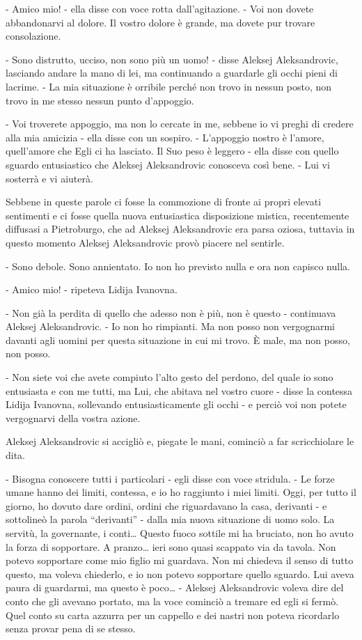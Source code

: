 - Amico mio! - ella disse con voce rotta dall'agitazione. - Voi non dovete abbandonarvi al dolore. Il vostro dolore è grande, ma dovete pur trovare consolazione. 

- Sono distrutto, ucciso, non sono più un uomo! - disse Aleksej Aleksandrovic, lasciando andare la mano di lei, ma continuando a guardarle gli occhi pieni di lacrime. - La mia situazione è orribile perché non trovo in nessun posto, non trovo in me stesso nessun punto d'appoggio. 

- Voi troverete appoggio, ma non lo cercate in me, sebbene io vi preghi di credere alla mia amicizia - ella disse con un sospiro. - L'appoggio nostro è l'amore, quell'amore che Egli ci ha lasciato. Il Suo peso è leggero - ella disse con quello sguardo entusiastico che Aleksej Aleksandrovic conosceva così bene. - Lui vi sosterrà e vi aiuterà. 

Sebbene in queste parole ci fosse la commozione di fronte ai propri elevati sentimenti e ci fosse quella nuova entusiastica disposizione mistica, recentemente diffusasi a Pietroburgo, che ad Aleksej Aleksandrovic era parsa oziosa, tuttavia in questo momento Aleksej Aleksandrovic provò piacere nel sentirle. 

- Sono debole. Sono annientato. Io non ho previsto nulla e ora non capisco nulla. 

- Amico mio! - ripeteva Lidija Ivanovna. 

- Non già la perdita di quello che adesso non è più, non è questo - continuava Aleksej Aleksandrovic. - Io non ho rimpianti. Ma non posso non vergognarmi davanti agli uomini per questa situazione in cui mi trovo. È male, ma non posso, non posso. 

- Non siete voi che avete compiuto l'alto gesto del perdono, del quale io sono entusiasta e con me tutti, ma Lui, che abitava nel vostro cuore - disse la contessa Lidija Ivanovna, sollevando entusiasticamente gli occhi - e perciò voi non potete vergognarvi della vostra azione. 

Aleksej Aleksandrovic si accigliò e, piegate le mani, cominciò a far scricchiolare le dita. 

- Bisogna conoscere tutti i particolari - egli disse con voce stridula. - Le forze umane hanno dei limiti, contessa, e io ho raggiunto i miei limiti. Oggi, per tutto il giorno, ho dovuto dare ordini, ordini che riguardavano la casa, derivanti - e sottolineò la parola ``derivanti'' - dalla mia nuova situazione di uomo solo. La servitù, la governante, i conti\ldots{} Questo fuoco sottile mi ha bruciato, non ho avuto la forza di sopportare. A pranzo\ldots{} ieri sono quasi scappato via da tavola. Non potevo sopportare come mio figlio mi guardava. Non mi chiedeva il senso di tutto questo, ma voleva chiederlo, e io non potevo sopportare quello sguardo. Lui aveva paura di guardarmi, ma questo è poco\ldots{} - Aleksej Aleksandrovic voleva dire del conto che gli avevano portato, ma la voce cominciò a tremare ed egli si fermò. Quel conto su carta azzurra per un cappello e dei nastri non poteva ricordarlo senza provar pena di se stesso. 

